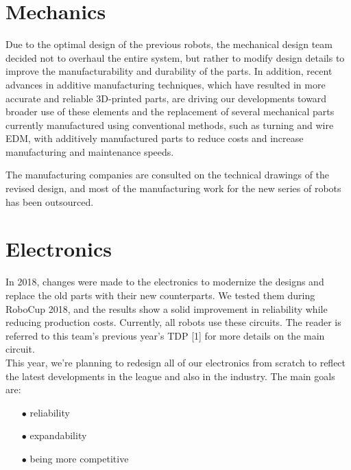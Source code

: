 \documentclass[runningheads]{llncs}
\begin{document}
\section {Mechanics}
Due to the optimal design of the previous robots, the mechanical design team decided not to overhaul the entire system, but rather to modify design details to improve the manufacturability and durability of the parts. In addition, recent advances in additive manufacturing techniques, which have resulted in more accurate and reliable 3D-printed parts, are driving our developments toward broader use of these elements and the replacement of several mechanical parts currently manufactured using conventional methods, such as turning and wire EDM, with additively manufactured parts to reduce costs and increase manufacturing and maintenance speeds.

The manufacturing companies are consulted on the technical drawings of the revised design, and most of the manufacturing work for the new series of robots has been outsourced.


\section{Electronics}

In 2018, changes were made to the electronics to modernize the designs and replace the old parts with their new counterparts. We tested them during RoboCup 2018, and the results show a solid improvement in reliability while reducing production costs. Currently, all robots use these circuits. The reader is referred to this team's previous year's TDP [1] for more details on the main circuit.\\
\indent This year, we're planning to redesign all of our electronics from scratch to reflect the latest developments in the league and also in the industry. The main goals are:

\begin{enumerate}
    \item[$\bullet$] reliability
    \item[$\bullet$] expandability
    \item[$\bullet$] being more competitive
\end{enumerate}
\end{document}
